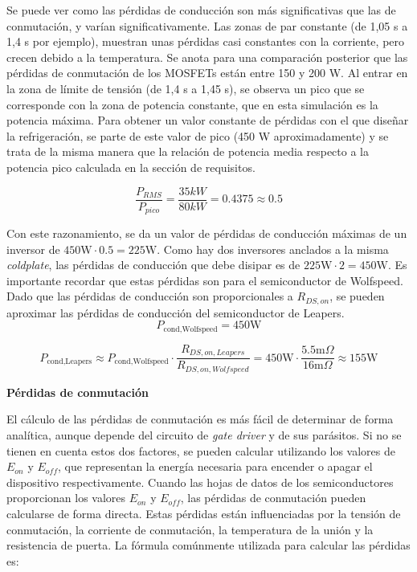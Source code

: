 Se puede ver como las pérdidas de conducción son más significativas que las de conmutación, y varían significativamente. Las zonas de par constante (de 1,05 s a 1,4 s por ejemplo), muestran unas pérdidas casi constantes con la corriente, pero crecen debido a la temperatura. Se anota para una comparación posterior que las pérdidas de conmutación de los MOSFETs están entre 150 y 200 W. Al entrar en la zona de límite de tensión (de 1,4 s a 1,45 s), se observa un pico que se corresponde con la zona de potencia constante, que en esta simulación es la potencia máxima. Para obtener un valor constante de pérdidas con el que diseñar la refrigeración, se parte de este valor de pico (450 W aproximadamente) y se trata de la misma manera que la relación de potencia media respecto a la potencia pico calculada en la sección de requisitos.

\[
\frac{P_{RMS}}{P_{pico}} = \frac{35 kW}{80 kW} = 0.4375 \approx 0.5
\]

Con este razonamiento, se da un valor de pérdidas de conducción máximas de un inversor de $450 \text{W} \cdot 0.5 = 225 \text{W}$. Como hay dos inversores anclados a la misma \textit{coldplate}, las pérdidas de conducción que debe disipar es de $225 \text{W} \cdot 2 = 450 \text{W}$. Es importante recordar que estas pérdidas son para el semiconductor de Wolfspeed. Dado que las pérdidas de conducción son proporcionales a $R_{DS, on}$, se pueden aproximar las pérdidas de conducción del semiconductor de Leapers.
\[
P_{\text{cond,Wolfspeed}} = 450 \text{W}
\]

\[
P_{\text{cond,Leapers}} \approx P_{\text{cond,Wolfspeed}} \cdot \frac{R_{DS, on, Leapers}}{R_{DS, on, Wolfspeed}} = 450 \text{W} \cdot \frac{5.5 \text{m}\Omega}{16 \text{m}\Omega} \approx 155 \text{W}
\]


\textbf{Pérdidas de conmutación}

El cálculo de las pérdidas de conmutación es más fácil de determinar de forma analítica, aunque depende del circuito de \textit{gate driver} y de sus parásitos. Si no se tienen en cuenta estos dos factores, se pueden calcular utilizando los valores de \(E_{on}\) y \(E_{off}\), que representan la energía necesaria para encender o apagar el dispositivo respectivamente. Cuando las hojas de datos de los semiconductores proporcionan los valores \(E_{on}\) y \(E_{off}\), las pérdidas de conmutación pueden calcularse de forma directa. Estas pérdidas están influenciadas por la tensión de conmutación, la corriente de conmutación, la temperatura de la unión y la resistencia de puerta. La fórmula comúnmente utilizada para calcular las pérdidas es:

